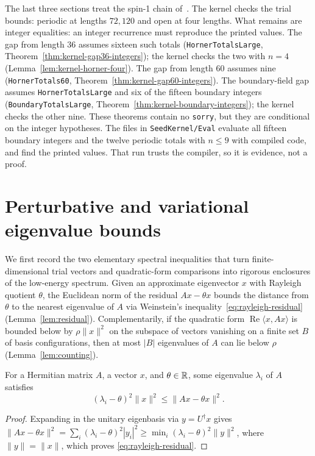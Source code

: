 The last three sections treat the spin-1 chain of~\cite{OpenAIHaldane, OpenAIBoundary}. The
kernel checks the trial bounds: periodic at lengths \(72, 120\) and open at four lengths.
What remains are integer equalities: an integer recurrence must reproduce the printed values.
The gap from length \(36\) assumes sixteen such totals (\texttt{HornerTotalsLarge},
Theorem~\ref{thm:kernel-gap36-integers}); the kernel checks the two with \(n = 4\)
(Lemma~\ref{lem:kernel-horner-four}). The gap from length \(60\) assumes nine
(\texttt{HornerTotals60}, Theorem~\ref{thm:kernel-gap60-integers}). The boundary-field gap
assumes \texttt{HornerTotalsLarge} and six of the fifteen boundary integers
(\texttt{BoundaryTotalsLarge}, Theorem~\ref{thm:kernel-boundary-integers}); the kernel checks
the other nine. These theorems contain no \texttt{sorry}, but they are conditional on the
integer hypotheses. The files in \texttt{SeedKernel/Eval} evaluate all fifteen boundary
integers and the twelve periodic totals with \(n \le 9\) with compiled code, and find the
printed values. That run trusts the compiler, so it is evidence, not a proof.

\section{Perturbative and variational eigenvalue bounds}

We first record the two elementary spectral inequalities that turn finite-dimensional trial vectors
and quadratic-form comparisons into rigorous enclosures of the low-energy spectrum. Given an
approximate eigenvector \(x\) with Rayleigh quotient \(\theta\), the Euclidean norm of the residual
\(Ax - \theta x\) bounds the distance from \(\theta\) to the nearest eigenvalue of \(A\) via
Weinstein's inequality~\eqref{eq:rayleigh-residual}~\cite{Weinstein1934Modified}
(Lemma~\ref{lem:residual}). Complementarily, if the quadratic form
\(\operatorname{Re}\langle x, Ax\rangle\) is bounded below by \(\rho\|x\|^2\) on the subspace of
vectors vanishing on a finite set \(B\) of basis configurations, then at most \(|B|\) eigenvalues
of \(A\) can lie below \(\rho\) (Lemma~\ref{lem:counting}).

\begin{lemma}
  \label{lem:residual}
  \leanok
  For a Hermitian matrix \(A\), a vector \(x\), and \(\theta \in \mathbb{R}\), some eigenvalue \(\lambda_i\)
  of \(A\) satisfies
  \begin{equation}
    \label{eq:rayleigh-residual}
    (\lambda_i - \theta)^2 \|x\|^2 \le \|Ax - \theta x\|^2.
  \end{equation}
\end{lemma}
\begin{proof}
  \leanok
  Expanding in the unitary eigenbasis via \(y = U^\dagger x\) gives
  \(\|Ax - \theta x\|^2 = \sum_i (\lambda_i - \theta)^2 |y_i|^2 \ge
  \min_i (\lambda_i - \theta)^2 \|y\|^2\), where \(\|y\| = \|x\|\), which proves
  \eqref{eq:rayleigh-residual}.
\end{proof}

